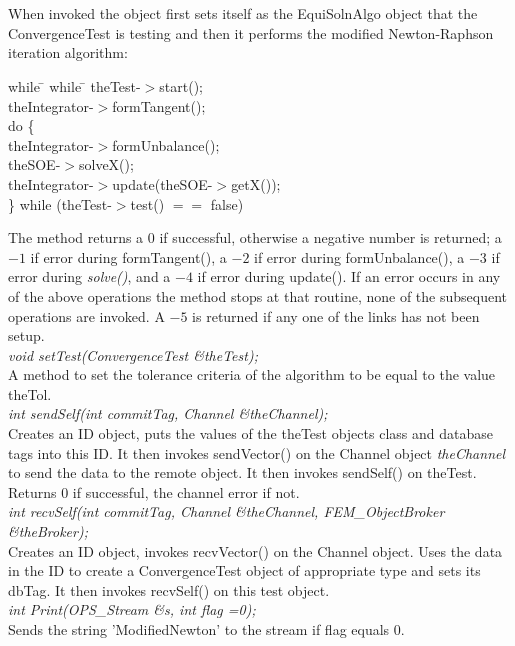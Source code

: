   \\
 \\
When invoked the object first sets itself as the EquiSolnAlgo object
that the ConvergenceTest is testing and then it performs the
modified Newton-Raphson iteration algorithm: 
\begin{tabbing}
while \= \+ while \= \kill
theTest-$>$start(); \\
theIntegrator-$>$formTangent(); \\
do \{ \+ \\
theIntegrator-$>$formUnbalance(); \\
theSOE-$>$solveX(); \\
theIntegrator-$>$update(theSOE-$>$getX()); \- \\
\} while (theTest-$>$test() $==$ false)\- \\
\end{tabbing}


\noindent The method returns a 0 if successful, otherwise a negative number is
returned; a $-1$ if error during formTangent(), a $-2$ if
error during formUnbalance(), a $-3$ if error during {\em
solve()}, and a $-4$ if error during update().
If an error occurs in any of the above operations the method stops at
that routine, none of the subsequent operations are invoked. A $-5$ is
returned if any one of the links has not been setup.\\

{\em void setTest(ConvergenceTest \&theTest);} \\
A method to set the tolerance criteria of the algorithm to be equal to
the value \p theTol. \\

{\em int sendSelf(int commitTag, Channel \&theChannel);}\\
Creates an ID object, puts the values of the \p theTest objects
class and database tags into this ID.
It then invokes sendVector() on the Channel object {\em
theChannel} to send the data to the remote object. It then invokes
sendSelf() on \p theTest. Returns $0$ if successful, the
 channel error if not. \\

{\em int recvSelf(int commitTag, Channel \&theChannel, FEM\_ObjectBroker
\&theBroker);}\\ 
Creates an ID object, invokes recvVector() on the Channel
object. Uses the data in the ID to create a ConvergenceTest object of
appropriate type and sets its dbTag. It then invokes recvSelf()
on this test object.  \\

{\em int Print(OPS\_Stream \&s, int flag =0);} \\
Sends the string 'ModifiedNewton' to the stream if \p flag equals $0$.

